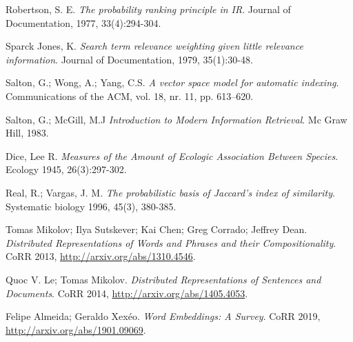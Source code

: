 \documentclass[titlepage]{article}
\begin{document}
	\renewcommand{\refname}{Bibliografía}
	\begin{thebibliography}{999}
		
		Robertson, S. E.
		\emph{The probability ranking principle in IR}.
		Journal of Documentation, 1977, 33(4):294-304.
		
		Sparck Jones, K.
		\emph{Search term relevance weighting given little relevance information}.
		Journal of Documentation, 1979, 35(1):30-48.
		
		Salton, G.; Wong, A.; Yang, C.S.
		\emph{A vector space model for automatic indexing}.
		Communications of the ACM, vol. 18, nr. 11, pp. 613–620.
		
		Salton, G.; McGill, M.J
		\emph{Introduction to Modern Information Retrieval}.
		Mc Graw Hill, 1983.
		
		Dice, Lee R.
		\emph{Measures of the Amount of Ecologic Association Between Species}.
		Ecology 1945, 26(3):297-302.
		
		Real, R.; Vargas, J. M.
		\emph{The probabilistic basis of Jaccard's index of similarity}.
		Systematic biology 1996, 45(3), 380-385.
		
		Tomas Mikolov; Ilya Sutskever; Kai Chen; Greg Corrado; Jeffrey Dean.
		\emph{Distributed Representations of Words and Phrases and their Compositionality}.
		CoRR 2013, \url{http://arxiv.org/abs/1310.4546}.
		
		Quoc V. Le; Tomas Mikolov.
		\emph{Distributed Representations of Sentences and Documents}.
		CoRR 2014, \url{http://arxiv.org/abs/1405.4053}.
		
		Felipe Almeida; Geraldo Xex{\'{e}}o.
		\emph{Word Embeddings: A Survey}.
		CoRR 2019, \url{http://arxiv.org/abs/1901.09069}.
		
	\end{thebibliography}
	
\end{document}
